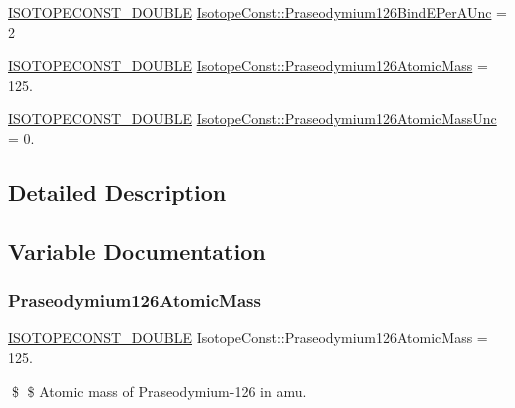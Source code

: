 \begin{DoxyCompactItemize}
\item 
\mbox{\hyperlink{group___isotope_const-_macros_ga8f45a7272ce02c0b4c65c44636ed719a}{I\+S\+O\+T\+O\+P\+E\+C\+O\+N\+S\+T\+\_\+\+D\+O\+U\+B\+LE}} \mbox{\hyperlink{group___isotope_const-_praseodymium-_pr126_gacc246ca52c2f5f55c72144723a2b5b66}{Isotope\+Const\+::\+Praseodymium126\+Bind\+E\+Per\+A\+Unc}} = 2
\item 
\mbox{\hyperlink{group___isotope_const-_macros_ga8f45a7272ce02c0b4c65c44636ed719a}{I\+S\+O\+T\+O\+P\+E\+C\+O\+N\+S\+T\+\_\+\+D\+O\+U\+B\+LE}} \mbox{\hyperlink{group___isotope_const-_praseodymium-_pr126_ga4247ff8c175cae52bf491d668dd77cf1}{Isotope\+Const\+::\+Praseodymium126\+Atomic\+Mass}} = 125.
\item 
\mbox{\hyperlink{group___isotope_const-_macros_ga8f45a7272ce02c0b4c65c44636ed719a}{I\+S\+O\+T\+O\+P\+E\+C\+O\+N\+S\+T\+\_\+\+D\+O\+U\+B\+LE}} \mbox{\hyperlink{group___isotope_const-_praseodymium-_pr126_ga5910fb1002033d67ed21bf9b02aee72b}{Isotope\+Const\+::\+Praseodymium126\+Atomic\+Mass\+Unc}} = 0.
\end{DoxyCompactItemize}


\subsection{Detailed Description}


\subsection{Variable Documentation}
\mbox{\label{group___isotope_const-_praseodymium-_pr126_ga4247ff8c175cae52bf491d668dd77cf1}} 
\subsubsection{\texorpdfstring{Praseodymium126\+Atomic\+Mass}{Praseodymium126AtomicMass}}
{\footnotesize\ttfamily \mbox{\hyperlink{group___isotope_const-_macros_ga8f45a7272ce02c0b4c65c44636ed719a}{I\+S\+O\+T\+O\+P\+E\+C\+O\+N\+S\+T\+\_\+\+D\+O\+U\+B\+LE}} Isotope\+Const\+::\+Praseodymium126\+Atomic\+Mass = 125.}

\$ \$ Atomic mass of Praseodymium-\/126 in amu. \mbox{\label{group___isotope_const-_praseodymium-_pr126_ga5910fb1002033d67ed21bf9b02aee72b}} 
